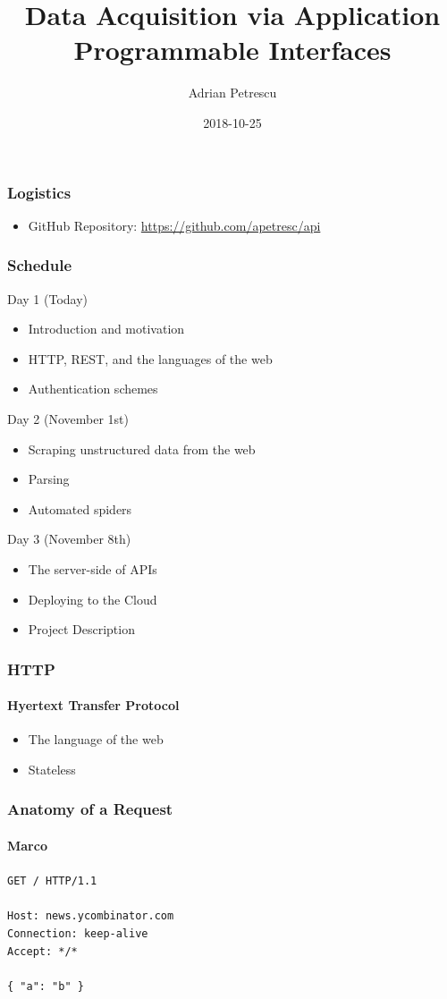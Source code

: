 \documentclass{beamer}
\title[Data Acquisition via APIs]{Data Acquisition via Application Programmable Interfaces}
\author{Adrian Petrescu}
\institute{Rubikloud}
\date{2018-10-25}
\begin{document}
\frame{\titlepage}


\begin{frame}
  \frametitle{Logistics}
  
  \begin{itemize}
    \item GitHub Repository: \href{https://github.com/apetresc/api}{https://github.com/apetresc/api}
  \end{itemize}
\end{frame}


\begin{frame}
  \frametitle{Schedule}
  
  \alert{Day 1 (Today)}
  \begin{itemize}
    \item Introduction and motivation
    \item HTTP, REST, and the languages of the web
    \item Authentication schemes
  \end{itemize}

  Day 2 (November 1st)
  \begin{itemize}
    \item Scraping unstructured data from the web
    \item Parsing 
    \item Automated spiders
  \end{itemize}

  Day 3 (November 8th)
  \begin{itemize}
    \item The server-side of APIs
    \item Deploying to the Cloud
    \item Project Description
  \end{itemize}
\end{frame}


\begin{frame}
  \frametitle{HTTP}
  \framesubtitle{Hyertext Transfer Protocol}
  \begin{itemize}
    \item The language of the web
    \item Stateless
  \end{itemize}
\end{frame}


\begin{frame}
  \frametitle{Anatomy of a Request}
  \framesubtitle{Marco}
  \texttt{{\color{red}GET} {\color{darkgreen}/} {\color{blue}HTTP/1.1}}
  \pause
  \\
  \bigskip
  \\
  {
    \color{olive}
    \texttt{Host: news.ycombinator.com} \\
    \texttt{Connection: keep-alive} \\
    \texttt{Accept: */*}
  }
  \\
  \pause
  \bigskip
  \\
  {
    \color{violet}
    \texttt{\{ "a": "b" \}}
  }
\end{frame}
\end{document}

